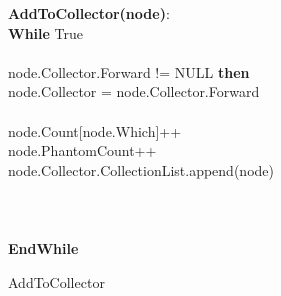 \begin{algorithm}[ht]
{\small
{\bf AddToCollector(node)}:\\
{\Indp
{\bf While} True\\
\\
 node.Collector.Forward != NULL {\bf then}\\
\quad \quad node.Collector = node.Collector.Forward\\
\\
\quad \quad node.Count[node.Which]++\\
\quad \quad node.PhantomCount++\\
\quad \quad node.Collector.CollectionList.append(node)\\
\quad {}\\
\\
\\
{\bf EndWhile}\\
}
}
\caption{AddToCollector}
\label{single:algorithm:addtocollector}
\end{algorithm}
\setlength{\textfloatsep}{0pt}

